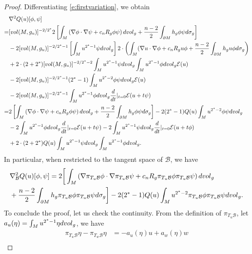 \documentclass[10pt,a4paper]{amsart}
\newcommand{\B}{\mathcal{B}}
\newcommand{\na}{{\nabla}}
\newcommand{\vol}{{\rm{vol}}}
\begin{document}
\begin{proof}
	Differentiating \eqref{e:firstvariation}, we obtain
   \begin{align}
       &\nabla^2Q(u)[\phi,\psi]\\
       =& [\vol(M, g_{u})]^{-2/2^*}2\left[\int_M \left(\na \phi \cdot \na \psi +c_n R_g\phi \psi  \right)d\vol_g +\frac{n-2}{2}\int_{\partial M}h_g\phi \psi d\sigma_g    \right] \notag \\
       &-2[\vol(M, g_{u})]^{-2/2^*-1}\left[\int_M u^{2^*-1}\psi d\vol_g  \right]2\cdot\left(\int_M(\na u \cdot \na \phi +c_nR_g u \phi +\frac{n-2}{2}\int_{\partial M}h_g u \phi d\sigma_g \right) \notag \\
       &+2\cdot(2+2^*)[\vol(M, g_{u})]^{-2/2^*-2}\int_M u^{2^*-1}\psi d\vol_g\int_M u^{2^*-1}\phi d\vol_g \mathcal E(u)\notag \\
       &-2[\vol(M, g_{u})]^{-2/2^*-1}(2^*-1)\int_M u^{2^*-2} \phi \psi d\vol_g \mathcal E(u) \notag \\
       &-2[\vol(M, g_{u})]^{-2/2^*-1}\int_M u^{2^*-1} \phi d\vol_g \frac{d}{dt}\large|_{t=0} \mathcal E(u+t\psi) \notag \\
       =&2\left[\int_M \left(\na \phi \cdot \na \psi +c_n R_g\phi \psi  \right)d\vol_g +\frac{n-2}{2}\int_{\partial M}h_g\phi \psi d\sigma_g    \right] -2(2^*-1)Q(u)\int_Mu^{2^*-2}\phi \psi d\vol_g \notag \\
       &-2\int_M u^{2^*-1} \phi d\vol_g \frac{d}{dt}\large|_{t=0} \mathcal E(u+t\psi)-2\int_M u^{2^*-1} \psi d\vol_g \frac{d}{dt}\large|_{t=0} \mathcal E(u+t\phi)\notag \\
       &+2\cdot (2+2^*) Q(u) \int_M u^{2^*-1}\psi d\vol_g\int_M u^{2^*-1}\phi d\vol_g. \notag 
   \end{align}
   In particular, when restricted to the tangent space of $\B$, we have
   \begin{align}
       &\nabla_\B^2Q(u)[\phi,\psi]=2\bigg[\int_M \left(\na \pi_{T_u\B}\phi \cdot \na \pi_{T_u\B}\psi +c_n R_g\pi_{T_u\B}\phi \pi_{T_u\B}\psi  \right)d\vol_g\\
       &+\frac{n-2}{2}\int_{\partial M}h_g\pi_{T_u\B}\phi \pi_{T_u\B}\psi d\sigma_g\bigg]
       -2(2^*-1)Q(u)\int_Mu^{2^*-2}\pi_{T_u\B}\phi \pi_{T_u\B}\psi d\vol_g. \notag
   \end{align}
   To conclude the proof, let us check the continuity. From the definition of $\pi_{T_u{\B}}$, let $a_u(\eta)= \int_M u^{2^* -1} \eta d \vol_g$, we have 
   \begin{align*}
       \pi_{T_u{\B}} \eta -\pi_{T_w{\B}} \eta &= -a_u(\eta)u +a_w(\eta) w\\

\end{align*}
\end{proof}
\end{document}

